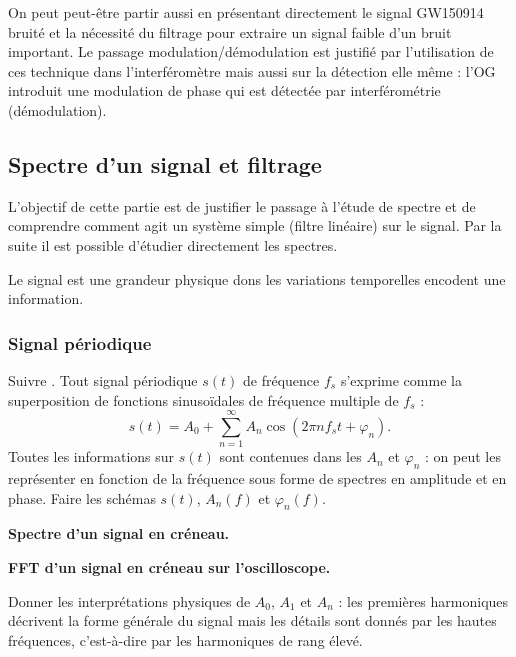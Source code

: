 On peut peut-être partir aussi en présentant directement le signal GW150914 bruité et la nécessité du filtrage pour extraire un signal faible d'un bruit important.
Le passage modulation/démodulation est justifié par l'utilisation de ces technique dans l'interféromètre mais aussi sur la détection elle même : l'OG introduit une  modulation de phase qui est détectée par interférométrie (démodulation).

\subsection{Spectre d'un signal et filtrage}

\begin{remarque}
L'objectif de cette partie est de justifier le passage à l'étude de spectre et de comprendre comment agit un système simple (filtre linéaire) sur le signal.
Par la suite il est possible d'étudier directement les spectres.
\end{remarque}

Le signal est une grandeur physique dons les variations temporelles encodent une information.

\subsubsection{Signal périodique}

Suivre \cite{Salamito2017}.
Tout signal périodique $s(t)$ de fréquence $f_s$ s'exprime comme la superposition de fonctions sinusoïdales de fréquence multiple de $f_s$ :
\begin{equation}
s(t) = A_0 + \sum_{n=1}^\infty A_n \cos(2\pi n f_s t + \varphi_n).
\end{equation}
Toutes les informations sur $s(t)$ sont contenues dans les $A_n$ et $\varphi_n$ : on peut les représenter en fonction de la fréquence sous forme de spectres en amplitude et en phase.
Faire les schémas $s(t)$, $A_n(f)$ et $\varphi_n(f)$.

\begin{slide}
\textbf{Spectre d'un signal en créneau.}
\end{slide}

\begin{experience}
\textbf{FFT d'un signal en créneau sur l'oscilloscope.}
\end{experience}

Donner les interprétations physiques de $A_0$, $A_1$ et $A_n$ : les premières harmoniques décrivent la forme générale du signal mais les détails sont donnés par les hautes fréquences, c'est-à-dire par les harmoniques de rang élevé.

